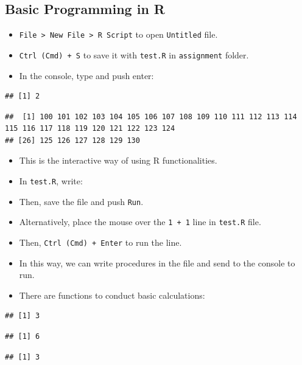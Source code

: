 \documentclass[
]{book}
\providecommand{\tightlist}{%
  \setlength{\itemsep}{0pt}\setlength{\parskip}{0pt}}
\begin{document}
\hypertarget{basic-programming-in-r}{%
\subsection{Basic Programming in R}\label{basic-programming-in-r}}

\begin{itemize}
\tightlist
\item
  \texttt{File\ \textgreater{}\ New\ File\ \textgreater{}\ R\ Script} to open \texttt{Untitled} file.
\item
  \texttt{Ctrl\ (Cmd)\ +\ S} to save it with \texttt{test.R} in \texttt{assignment} folder.
\item
  In the console, type and push enter:
\end{itemize}

\begin{verbatim}
## [1] 2
\end{verbatim}

\begin{verbatim}
##  [1] 100 101 102 103 104 105 106 107 108 109 110 111 112 113 114 115 116 117 118 119 120 121 122 123 124
## [26] 125 126 127 128 129 130
\end{verbatim}

\begin{itemize}
\item
  This is the interactive way of using R functionalities.
\item
  In \texttt{test.R}, write:
\item
  Then, save the file and push \texttt{Run}.
\item
  Alternatively, place the mouse over the \texttt{1\ +\ 1} line in \texttt{test.R} file.
\item
  Then, \texttt{Ctrl\ (Cmd)\ +\ Enter} to run the line.
\item
  In this way, we can write procedures in the file and send to the console to run.
\item
  There are functions to conduct basic calculations:
\end{itemize}

\begin{verbatim}
## [1] 3
\end{verbatim}

\begin{verbatim}
## [1] 6
\end{verbatim}

\begin{verbatim}
## [1] 3
\end{verbatim}
\end{document}
